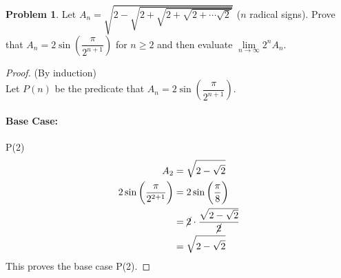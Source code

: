 \documentclass[14]{article}
\theoremstyle{definition}
\newtheorem{prob}{Problem}
\theoremstyle{case}
\begin{document}
\begin{prob}
Let $A_n = \sqrt{2 - \sqrt{2 + \sqrt{2 + \sqrt{2 + \cdots \sqrt{2}}}}}$ ($n$ radical signs). Prove that $A_n = 2 \sin\left(\dfrac{\pi}{2^{n+1}}\right)$ for $n \geq 2$ and then evaluate $\lim\limits_{n \to \infty} 2^n A_n$.
\begin{proof}
(By induction)\\
Let $P(n)$ be the predicate that $A_n = 2 \sin\left(\dfrac{\pi}{2^{n+1}}\right)$.
\paragraph{Base Case:} P(2)
\begin{align*}
A_2 &= \sqrt{2 - \sqrt{2}}\\
2\sin\left(\dfrac{\pi}{2^{2+1}}\right) &= 2\sin\left(\dfrac{\pi}{8}\right)\\
&= \cancel{2} \cdot \dfrac{\sqrt{2 - \sqrt{2}}}{\cancel{2}}\\
&= \sqrt{2 - \sqrt{2}}
\end{align*}
This proves the base case P(2).

\end{proof}
\end{prob}
\end{document}
